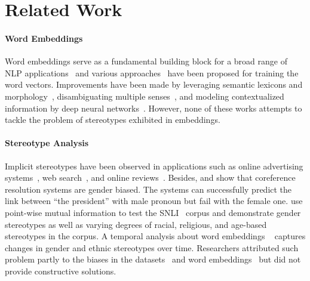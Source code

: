 \section{Related Work}
\label{sec:related_work}
\paragraph{Word Embeddings}
Word embeddings serve as a fundamental building block for a broad range of NLP applications~\cite{sentiment,machinetranslation,realtionextraction}
 and various approaches~\cite{mikolov,glove,yoav} have been proposed for training the word vectors. %
Improvements have been made by leveraging semantic lexicons and morphology~\cite{luong2013better,faruqui2014}, disambiguating multiple senses~\cite{vsuster2016bilingual,arora2018linear,upadhyay2017beyond}, and modeling contextualized information by deep neural networks~\cite{elmo}.  
However, none of these works attempts to tackle the problem of stereotypes exhibited in embeddings.

\paragraph{Stereotype Analysis}
Implicit stereotypes have been observed in applications such as online advertising systems~\cite{sweeney2013discrimination}, web search~\cite{kay2015unequal}, and online reviews~\cite{wallace2016jerk}.
Besides,  and  show that  coreference resolution systems are gender biased. The systems can successfully predict the link between ``the president'' with male pronoun but fail with the female one.   use point-wise mutual information
to test the SNLI~\cite{snli:emnlp2015} corpus and demonstrate gender stereotypes as well as varying degrees of
racial, religious, and age-based stereotypes in the corpus. A temporal analysis about word embeddings ~\cite{garg2018word} captures changes in gender and ethnic stereotypes over time.
Researchers attributed such problem partly to the biases in the datasets~\cite{jieyu,yao2017beyond} and word embeddings~\cite{garg2017word,caliskan2017semantics} but did not provide constructive solutions.

